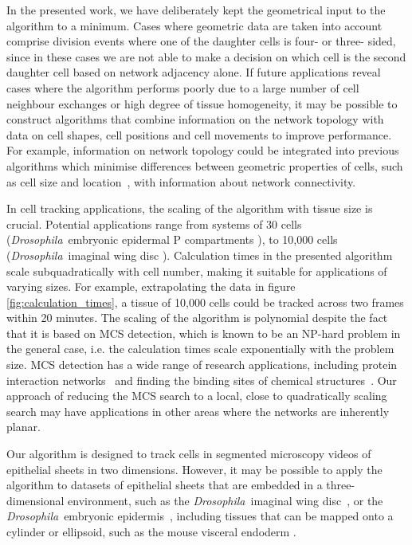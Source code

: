 \documentclass[a4paper,11pt]{article}
\newcommand{\Drosophila}{\textit{Drosophila}~}
\begin{document}
In the presented work, we have deliberately kept the geometrical input to the algorithm to a minimum. 
Cases where geometric data are taken into account comprise division events where one of the daughter cells is four- or three- sided, since in these cases we are not able to make a decision on which cell is the second daughter cell based on network adjacency alone. 
If future applications reveal cases where the algorithm performs poorly due to a large number of cell neighbour exchanges or high degree of tissue homogeneity, it may be possible to construct algorithms that combine information on the network topology with data on cell shapes, cell positions and cell movements to improve performance. For example, information on network topology could be integrated into previous algorithms which minimise differences between geometric properties of cells, such as cell size and location~\cite{Puliafito2012}, with information about network connectivity. 

In cell tracking applications, the scaling of the algorithm with tissue size is crucial. 
Potential applications range from systems of 30 cells (\Drosophila embryonic epidermal P compartments \cite{Parker2006}), to 10,000 cells (\Drosophila imaginal wing disc \cite{Farhadifar2007}). 
Calculation times in the presented algorithm scale subquadratically with cell number, making it suitable for applications of varying sizes. 
For example, extrapolating the data in figure \ref{fig:calculation_times}, a tissue of 10,000 cells could be tracked across two frames within 20 minutes. The scaling of the algorithm is polynomial despite the fact that it is based on MCS detection, which is known to be an NP-hard problem in the general case, i.e. the calculation times scale exponentially with the problem size. 
MCS detection has a wide range of research applications, including protein interaction networks~\cite{Ciriello2012, Aladag2013} and finding the binding sites of chemical structures~\cite{Raymond2002}. 
Our approach of reducing the MCS search to a local, close to quadratically scaling search may have applications in other areas where the networks are inherently planar.

Our algorithm is designed to track cells in segmented microscopy videos of epithelial sheets in two dimensions. However, it may be possible to apply the algorithm to datasets of epithelial sheets that are embedded in a three-dimensional environment, such as the \Drosophila imaginal wing disc~\cite{Mao2011}, or the \Drosophila embryonic epidermis~\cite{Parker2006, Rauzi2008}, including tissues that can be mapped onto a cylinder or ellipsoid, such as the mouse visceral endoderm \cite{Trichas2012}. 
\end{document}
